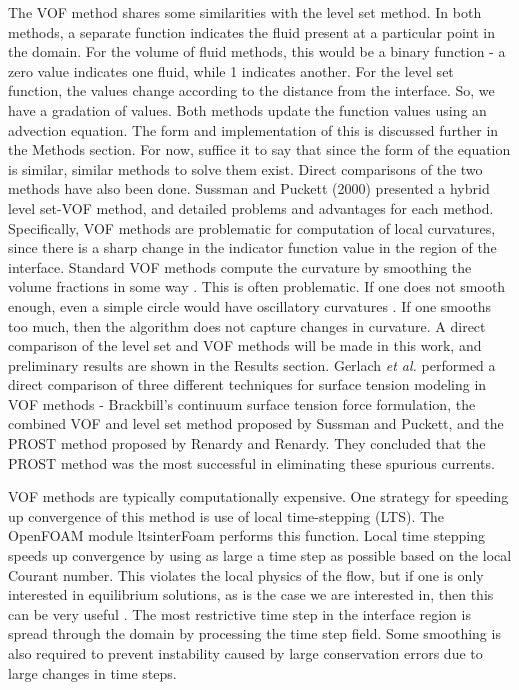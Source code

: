 The VOF method shares some similarities with the level set method. In both methods, a separate function indicates the fluid present at a particular point in the domain. For the volume of fluid methods, this would be a binary function - a zero value indicates one fluid, while 1 indicates another. For the level set function, the values change according to the distance from the interface. So, we have a gradation of values. Both methods update the function values using an advection equation. The form and implementation of this is discussed further in the Methods section. For now, suffice it to say that since the form of the equation is similar, similar methods to solve them exist. Direct comparisons of the two methods have also been done. Sussman and Puckett (2000) presented a hybrid level set-VOF method, and detailed problems and advantages for each method. Specifically, VOF methods are problematic for computation of local curvatures, since there is a sharp change in the indicator function value in the region of the interface. Standard VOF methods compute the curvature by smoothing the volume fractions in some way \cite{}. This is often problematic. If one does not smooth enough, even a simple circle would have oscillatory curvatures \cite{}. If one smooths too much, then the algorithm does not capture changes in curvature. A direct comparison of the level set and VOF methods will be made in this work, and preliminary results are shown in the Results section. Gerlach \emph{et al.} performed a direct comparison of three different techniques for surface tension modeling in VOF methods - Brackbill's continuum surface tension force formulation, the combined VOF and level set method proposed by Sussman and Puckett, and the PROST method proposed by Renardy and Renardy. They concluded that the PROST method was the most successful in eliminating these spurious currents.

VOF methods are typically computationally expensive. One strategy for speeding up convergence of this method is use of local time-stepping (LTS). The OpenFOAM module ltsinterFoam performs this function. Local time stepping speeds up convergence by using as large a time step as possible based on the local Courant number. This violates the local physics of the flow, but if one is only interested in equilibrium solutions, as is the case we are interested in, then this can be very useful \cite{}. The most restrictive time step in the interface region is spread through the domain by processing the time step field. Some smoothing is also required to prevent instability caused by large conservation errors due to large changes in time steps.

